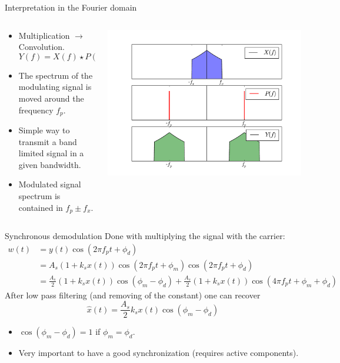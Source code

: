\begin{block}{Interpretation in the Fourier domain}
  \begin{columns}
  \begin{column}{5.5cm}
    \begin{itemize}
    \item Multiplication $\rightarrow$ Convolution.
$$Y(f)=X(f)\star P(f)$$
    \item The spectrum of the modulating signal is moved around the frequency $f_p$.
    \item Simple way to transmit a band limited signal in a given bandwidth.
    \item Modulated signal spectrum is contained in $f_p\pm f_x$.
    \end{itemize}
  \end{column}\hspace{-5mm}
  \begin{column}{5.5cm}
    \begin{center}\vspace{-1cm}\hspace{-5mm}
      \includegraphics[width=0.5\linewidth]{imgs/fourier/mod_ampl_spectrum2.pdf}
    \end{center}

  \end{column}        
  \end{columns}

\end{block}

\begin{block}{Synchronous demodulation}
  Done with multiplying the signal with the carrier:
\begin{align*}
\label{eq:4}
w(t)&=y(t)\cos(2\pi f_p t+\phi_d)\\
&=A_s(1+k_sx(t))\cos(2\pi f_p t+\phi_m)\cos(2\pi f_p t+\phi_d)\\
&={{\frac{A_s}{2}(1+k_sx(t))\cos(\phi_m-\phi_d)+\frac{A_s}{2}(1+k_sx(t))\cos(4\pi f_pt+\phi_m+\phi_d)}}
\end{align*}%
After low pass filtering (and removing of the constant) one can recover 
$$\hat x(t)=\frac{A_s}{2}k_sx(t)\cos(\phi_m-\phi_d)$$
\begin{itemize}
\item  $\cos(\phi_m-\phi_d)=1$ if $\phi_m=\phi_d$.
\item Very important to have a good synchronization (requires active components).
\end{itemize}
\end{block}


